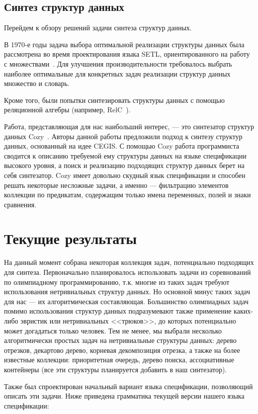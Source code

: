 \documentclass[14pt]{matmex-diploma}
\begin{document}
\subsection{Синтез структур данных}
Перейдем к обзору решений задачи синтеза структур данных.

В 1970-е годы задача выбора оптимальной реализации структуры данных была рассмотрена во время проектирования языка SETL, ориентированного на работу с множествами~\cite{setl}. Для улучшения производительности требовалось выбрать наиболее оптимальные для конкретных задач реализации структур данных множество и словарь.

Кроме того, были попытки синтезировать структуры данных с помощью реляционной алгебры (например, RelC~\cite{RelC}).

Работа, представляющая для нас наибольший интерес, --- это синтезатор структур данных Cozy~\cite{Cozy}. Авторы данной работы предложили подход к синтезу структур данных, основанный на идее CEGIS. С помощью Cozy работа программиста сводится к описанию требуемой ему структуры данных на языке спецификации высокого уровня, а поиск и реализацию подходящих структур данных берет на себя синтезатор. Cozy имеет довольно скудный язык спецификации и способен решать некоторые несложные задачи, а именно --- фильтрацию элементов коллекции по предикатам, содержащим только имена переменных, полей и знаки сравнения.

\section{Текущие результаты}
На данный момент собрана некоторая коллекция задач, потенциально подходящих для синтеза. Первоначально планировалось использовать задачи из соревнований по олимпиадному программированию, т.к. многие из таких задач требуют использования нетривиальных структур данных. Но основной минус таких задач для нас --- их алгоритмическая составляющая. Большинство олимпиадных задач помимо использования структур данных подразумевают также применение каких-либо эвристик или нетривиальных <<трюков>>, до которых потенциально может догадаться только человек. Тем не менее, мы выбрали несколько алгоритмически простых задач на нетривиальные структуры данных: дерево отрезков, декартово дерево, корневая декомпозиция отрезка, а также на более известные коллекции: приоритетная очередь, дерево поиска, ассоциативные контейнеры (все эти структуры планируется добавить в наш синтезатор).

Также был спроектирован начальный вариант языка спецификации, позволяющий описать эти задачи. Ниже приведена грамматика текущей версии нашего языка спецификации:
\end{document}
